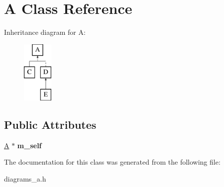 \hypertarget{classA}{\section{A Class Reference}
\label{classA}
}
Inheritance diagram for A\-:\begin{figure}[H]
\begin{center}
\leavevmode
\includegraphics[height=3.000000cm]{classA}
\end{center}
\end{figure}
\subsection*{Public Attributes}
\begin{DoxyCompactItemize}
\item 
\hypertarget{classA_a086d3a4efc697dba0601b9fef3d082ad}{\hyperlink{classA}{A} $\ast$ {\bfseries m\-\_\-self}}\label{classA_a086d3a4efc697dba0601b9fef3d082ad}

\end{DoxyCompactItemize}


The documentation for this class was generated from the following file\-:\begin{DoxyCompactItemize}
\item 
diagrams\-\_\-a.\-h\end{DoxyCompactItemize}

